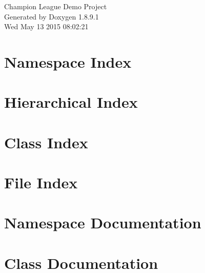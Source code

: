 \documentclass[twoside]{book}
\newcommand{\+}{\discretionary{\mbox{\scriptsize$\hookleftarrow$}}{}{}}
\newcommand{\clearemptydoublepage}{%
  \newpage{\pagestyle{empty}\cleardoublepage}%
}
\begin{document}
\hypersetup{pageanchor=false,
             bookmarks=true,
             bookmarksnumbered=true,
             pdfencoding=unicode
            }
\begin{titlepage}
\vspace*{7cm}
\begin{center}%
{\Large Champion League Demo Project }\\
\vspace*{1cm}
{\large Generated by Doxygen 1.8.9.1}\\
\vspace*{0.5cm}
{\small Wed May 13 2015 08:02:21}\\
\end{center}
\end{titlepage}
\clearemptydoublepage
\tableofcontents
\clearemptydoublepage
{}
\hypersetup{pageanchor=true}

\chapter{Namespace Index}

\chapter{Hierarchical Index}

\chapter{Class Index}

\chapter{File Index}

\chapter{Namespace Documentation}

\chapter{Class Documentation}
















\end{document}
